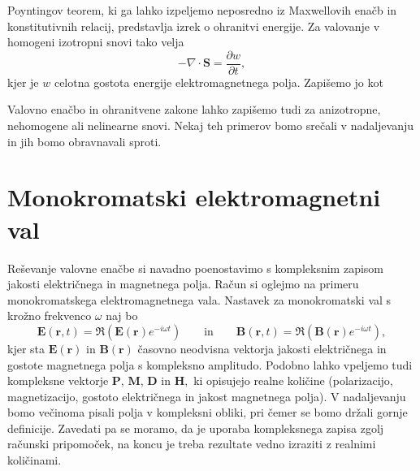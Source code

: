 Poyntingov teorem, ki ga lahko izpeljemo neposredno 
iz Maxwellovih enačb in konstitutivnih relacij, predstavlja izrek o ohranitvi 
energije. Za valovanje v homogeni izotropni snovi tako velja
\begin{equation}
-\nabla\cdot\mathbf{S}=\frac{\partial w}{\partial t},
\end{equation}
kjer je $w$ celotna
gostota energije elektromagnetnega polja. Zapišemo jo kot 

Valovno enačbo in ohranitvene zakone lahko zapišemo tudi za anizotropne,
nehomogene ali nelinearne snovi. Nekaj teh primerov bomo srečali v nadaljevanju
in jih bomo obravnavali sproti.

\section{Monokromatski elektromagnetni val}
Reševanje valovne enačbe si navadno poenostavimo s kompleksnim
zapisom jakosti električnega in magnetnega polja. Račun si
oglejmo na primeru monokromatskega elektromagnetnega vala. Nastavek
za monokromatski val s krožno frekvenco $\omega$ naj bo
\begin{equation}
\mathbf{E}(\mathbf{r},t)  =\mathfrak{\Re}(\mathbf{E}(\mathbf{r})e^{-i\omega t})\qquad \textrm{in} \qquad
\mathbf{B}(\mathbf{r},t)  =\mathfrak{\Re}(\mathbf{B}(\mathbf{r})e^{-i\omega t}),
\label{eq:rval}
\end{equation}
kjer sta $\mathbf E(\mathbf{r})$ in $\mathbf B(\mathbf{r})$ časovno
neodvisna vektorja jakosti električnega in gostote
magnetnega polja s kompleksno
amplitudo. Podobno lahko vpeljemo tudi kompleksne vektorje $\mathbf{P}$,
$\mathbf{M}$, $\mathbf{D}$ in $\mathbf{H},$ ki opisujejo realne količine (polarizacijo,
magnetizacijo, gostoto električnega in jakost magnetnega polja).
V nadaljevanju bomo večinoma pisali polja v kompleksni obliki, pri
čemer se bomo držali gornje definicije. Zavedati pa se moramo, da
je uporaba kompleksnega zapisa zgolj računski pripomoček, na koncu
je treba rezultate vedno izraziti z realnimi količinami. 

